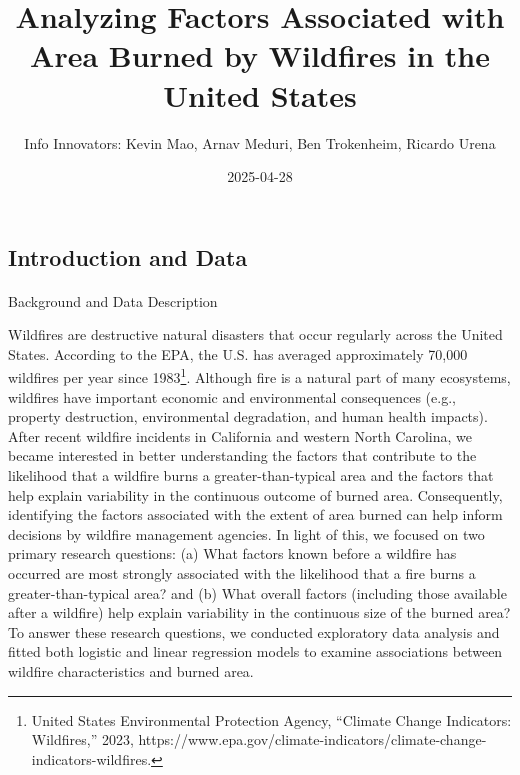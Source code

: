 \documentclass[
  letterpaper,
  DIV=11,
  numbers=noendperiod]{scrartcl}
\title{Analyzing Factors Associated with Area Burned by Wildfires in the
United States}
\author{Info Innovators: Kevin Mao, Arnav Meduri, Ben Trokenheim,
Ricardo Urena}
\date{2025-04-28}
\makeatletter
\let\oldparagraph\paragraph
\renewcommand{\paragraph}{
    \@ifstar
      \xxxParagraphStar
      \xxxParagraphNoStar
  }
\newcommand{\xxxParagraphStar}[1]{\oldparagraph*{#1}\mbox{}}
\newcommand{\xxxParagraphNoStar}[1]{\oldparagraph{#1}\mbox{}}
\makeatother
\begin{document}
\maketitle


\subsection{Introduction and Data}\label{introduction-and-data}

\paragraph{Background and Data
Description}\label{background-and-data-description}

Wildfires are destructive natural disasters that occur regularly across
the United States. According to the EPA, the U.S. has averaged
approximately 70,000 wildfires per year since 1983\footnote{United
  States Environmental Protection Agency, ``Climate Change Indicators:
  Wildfires,'' 2023,
  https://www.epa.gov/climate-indicators/climate-change-indicators-wildfires.}.
Although fire is a natural part of many ecosystems, wildfires have
important economic and environmental consequences (e.g., property
destruction, environmental degradation, and human health impacts). After
recent wildfire incidents in California and western North Carolina, we
became interested in better understanding the factors that contribute to
the likelihood that a wildfire burns a greater-than-typical area and the
factors that help explain variability in the continuous outcome of
burned area. Consequently, identifying the factors associated with the
extent of area burned can help inform decisions by wildfire management
agencies. In light of this, we focused on two primary research
questions: (a) What factors known before a wildfire has occurred are
most strongly associated with the likelihood that a fire burns a
greater-than-typical area? and (b) What overall factors (including those
available after a wildfire) help explain variability in the continuous
size of the burned area? To answer these research questions, we
conducted exploratory data analysis and fitted both logistic and linear
regression models to examine associations between wildfire
characteristics and burned area.
\end{document}
